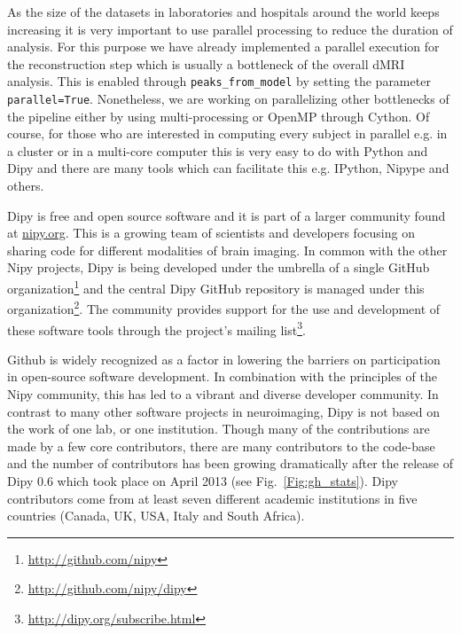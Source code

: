 \documentclass{bioinfo}
\begin{document}
As the size of the datasets in laboratories and hospitals around the world keeps increasing it is very important to use parallel processing to reduce the duration of analysis. For this purpose we have already implemented a parallel execution for the reconstruction step which is usually a bottleneck of the overall dMRI analysis. This is enabled through \texttt{peaks\_from\_model} by setting the parameter \texttt{parallel=True}. Nonetheless, we are working on parallelizing other bottlenecks of the pipeline either by using multi-processing or OpenMP through Cython. Of course, for those who are interested in computing every
subject in parallel e.g. in a cluster or in a multi-core computer this is very easy to do with Python and Dipy and there are many tools which can facilitate this e.g. IPython, Nipype and others.

Dipy is free and open source software and it is part of a larger community found at \url{nipy.org}.
This is a growing team of scientists and developers focusing on sharing code for different modalities
of brain imaging. In common with the other Nipy projects, Dipy is being developed under the
umbrella of a single GitHub organization\footnote{\url{http://github.com/nipy}} and the central
Dipy GitHub repository is managed under this organization\footnote{\url{http://github.com/nipy/dipy}}.
The community provides support for the use and development of these software tools through
the project's mailing list\footnote{\url{http://dipy.org/subscribe.html}}.

Github is widely recognized as a factor in lowering the barriers on
participation in open-source software development. In combination with
the principles of the Nipy community, this has led to a vibrant and diverse
developer community. In contrast to many other software projects in
neuroimaging, Dipy is not based on the work of one lab, or one institution. Though
many of the contributions are made by a few core contributors, there are many
contributors to the code-base and the number of contributors has been growing
dramatically after the release of Dipy 0.6 which took place on April 2013 (see
Fig.~\ref{Fig:gh_stats}).
Dipy contributors come from at least seven different academic
institutions in five countries (Canada, UK, USA, Italy and South Africa).
\end{document}
